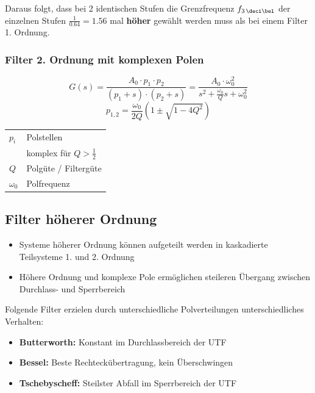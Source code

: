 Daraus folgt, dass bei 2 identischen Stufen die Grenzfrequenz $f_{3 \, \deci \bel}$ der einzelnen Stufen $\frac{1}{0.64} = 1.56$ mal 
\textbf{höher} gewählt werden muss als bei einem Filter 1. Ordnung.


\subsubsection{Filter 2. Ordnung mit komplexen Polen}

\begin{minipage}[c]{0.6\columnwidth}
    $$ G(s) = \frac{A_0 \cdot p_1 \cdot p_2}{(p_1 + s) \cdot (p_2 + s)} = \frac{A_0 \cdot \omega_0^2}{s^2 + \frac{\omega_0}{Q} s + \omega_0^2} $$
$$ p_{1,2} = \frac{\omega_0}{2 Q} (1 \pm \sqrt{1 - 4 Q^2}) $$
\end{minipage}
\hfill
\begin{minipage}[c]{0.38\columnwidth}
    \begin{tabular}{ll}
        $p_i$       & Polstellen \\
                    & komplex für $Q > \frac{1}{2}$ \\
        $Q$         & Polgüte / Filtergüte \\
        $\omega_0$  & Polfrequenz
    \end{tabular}
\end{minipage}



\subsection{Filter höherer Ordnung}

\begin{itemize}
    \item Systeme höherer Ordnung können aufgeteilt werden in kaskadierte Teilsysteme 1. und 2. Ordnung
    \item Höhere Ordnung und komplexe Pole ermöglichen steileren Übergang zwischen Durchlass- und Sperrbereich
\end{itemize}

Folgende Filter erzielen durch unterschiedliche Polverteilungen unterschiedliches Verhalten:

\begin{itemize}
    \item \textbf{Butterworth:} Konstant im Durchlassbereich der UTF
    \item \textbf{Bessel:} Beste Rechteckübertragung, kein Überschwingen
    \item \textbf{Tschebyscheff:} Steilster Abfall im Sperrbereich der UTF
\end{itemize}


